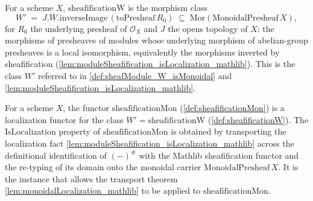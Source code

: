 \begin{definition}

  \label{def:sheafificationW}
  For a scheme \(X\), \(\mathrm{sheafificationW}\) is the morphism class
  \[
    W' \;=\; J.W.\mathrm{inverseImage}\,(\mathrm{toPresheaf}\,R_0)
      \;\subseteq\; \mathrm{Mor}(\mathrm{MonoidalPresheaf}\,X),
  \]
  for \(R_0\) the underlying presheaf of \(\mathcal{O}_X\) and \(J\) the opens
  topology of \(X\): the morphisms of presheaves of modules whose underlying
  morphism of abelian-group presheaves is a local isomorphism, equivalently the
  morphisms inverted by sheafification
  (\cref{lem:moduleSheafification_isLocalization_mathlib}). This is the class
  \(W'\) referred to in \cref{def:sheafModule_W_isMonoidal} and
  \cref{lem:moduleSheafification_isLocalization_mathlib}.
\end{definition}

\begin{lemma}

  \label{def:sheafificationMon_isLocalization}
  For a scheme \(X\), the functor \(\mathrm{sheafificationMon}\)
  (\cref{def:sheafificationMon}) is a localization functor for the class
  \(W' = \mathrm{sheafificationW}\) (\cref{def:sheafificationW}). The
  \(\mathrm{IsLocalization}\) property of \(\mathrm{sheafificationMon}\) is
  obtained by transporting the localization fact
  \cref{lem:moduleSheafification_isLocalization_mathlib} across the definitional
  identification of \((-)^{\#}\) with the Mathlib sheafification functor and the
  re-typing of its domain onto the monoidal carrier \(\mathrm{MonoidalPresheaf}\,X\).
  It is the instance that allows the transport theorem
  \cref{lem:monoidalLocalization_mathlib} to be applied to
  \(\mathrm{sheafificationMon}\).
\end{lemma}

